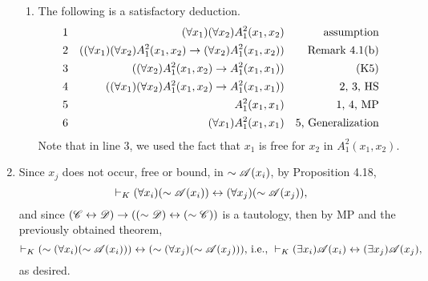 \begin{enumerate}
\begin{enumerate}
      \item The following is a satisfactory deduction.
        \begin{align*}
          \text{1}&&
          (\forall x_1)(\forall x_2)A^2_1(x_1, x_2)&&
          \text{assumption}\\
          \text{2}&&
          ((\forall x_1)(\forall x_2)A^2_1(x_1, x_2) \rightarrow (\forall x_2)A^2_1(x_1, x_2))&&
          \text{Remark 4.1(b)}\\
          \text{3}&&
          ((\forall x_2)A^2_1(x_1, x_2) \rightarrow A^2_1(x_1, x_1))&&
          \text{(K5)}\\
          \text{4}&&
          ((\forall x_1)(\forall x_2)A^2_1(x_1, x_2) \rightarrow A^2_1(x_1, x_1))&&
          \text{2, 3, HS}\\
          \text{5}&&
          A^2_1(x_1, x_1)&&
          \text{1, 4, MP}\\
          \text{6}&&
          (\forall x_1)A^2_1(x_1, x_1)&&
          \text{5, Generalization}
        \end{align*}
        Note that in line 3, we used the fact that \(x_1\) is free for \(x_2\) in \(A^2_1(x_1, x_2)\).
    \end{enumerate}
  \item %
    Since \(x_j\) does not occur, free or bound, in \(\sim\mathscr{A}(x_i)\), by Proposition 4.18,
      \[\vdash_{K} (\forall x_i)(\sim\mathscr{A}(x_i)) \leftrightarrow (\forall x_j)(\sim\mathscr{A}(x_j)),\]
    and since \((\mathscr{C} \leftrightarrow \mathscr{D}) \rightarrow ((\sim\mathscr{D}) \leftrightarrow (\sim\mathscr{C}))\) is a tautology, then by MP and the previously obtained theorem,
      \[\vdash_{K} (\sim(\forall x_i)(\sim\mathscr{A}(x_i))) \leftrightarrow (\sim(\forall x_j)(\sim\mathscr{A}(x_j))) \text{, i.e., } \vdash_{K} (\exists x_i)\mathscr{A}(x_i) \leftrightarrow (\exists x_j)\mathscr{A}(x_j),\]
      as desired.
\end{enumerate}

